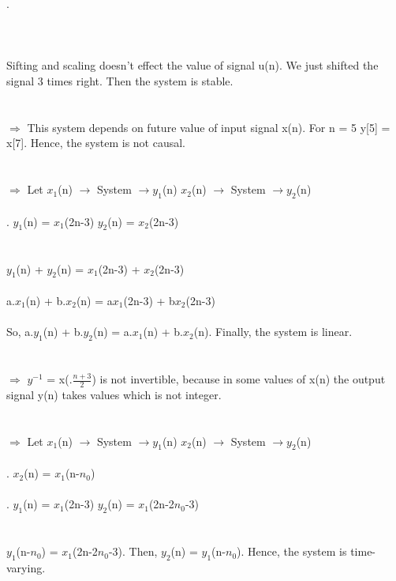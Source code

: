 \documentclass[10pt,a4paper, margin=1in]{article}
\begin{document}
\begin{enumerate}
\begin{enumerate}
\begin{tikzpicture}
\end{tikzpicture}
.\\\\\\\\
    Sifting and scaling doesn't effect the value of signal u(n). We just shifted the signal 3 times right. Then the system is stable.\\\\\\
    $\Rightarrow$ This system depends on future value of input signal x(n). For n = 5  y[5] = x[7]. Hence, the system is not causal.\\\\\\
     $\Rightarrow$ Let $x_{1}$(n) $\rightarrow$  System $\rightarrow y_{1}$(n) \hspace{5cm} $x_{2}$(n) $\rightarrow$  System $\rightarrow y_{2}$(n)\\\\
    .\hspace{0.7cm} $y_{1}$(n) = $x_{1}$(2n-3) \hspace{6.7cm} $y_{2}$(n) = $x_{2}$(2n-3)\\\\\\
    $y_{1}$(n) + $y_{2}$(n) = $x_{1}$(2n-3) + $x_{2}$(2n-3)\\\\
    a.$x_{1}$(n) + b.$x_{2}$(n) = a$x_{1}$(2n-3) + b$x_{2}$(2n-3)\\\\
    So, a.$y_{1}$(n) + b.$y_{2}$(n) = a.$x_{1}$(n) + b.$x_{2}$(n). Finally, the system is linear.\\\\\\
    $\Rightarrow$ $y^{-1}$ = x(.$\frac{n+3}{2}$) is not invertible, because in some values of x(n) the output signal y(n) takes values which is not integer.\\\\\\
    $\Rightarrow$ Let $x_{1}$(n) $\rightarrow$  System $\rightarrow y_{1}$(n) \hspace{5cm} $x_{2}$(n) $\rightarrow$  System $\rightarrow y_{2}$(n)\\\\
    .\hspace{10.3cm} $x_{2}$(n) = $x_{1}$(n-$n_{0}$)\\\\
    .\hspace{0.7cm} $y_{1}$(n) = $x_{1}$(2n-3) \hspace{6.7cm} $y_{2}$(n) = $x_{1}$(2n-2$n_{0}$-3)\\\\\\
    $y_{1}$(n-$n_{0}$) = $x_{1}$(2n-2$n_{0}$-3). Then, $y_{2}$(n) =  $y_{1}$(n-$n_{0}$). Hence, the system is time-varying.\\\\
    

\end{enumerate}
\end{enumerate}
\end{document}
